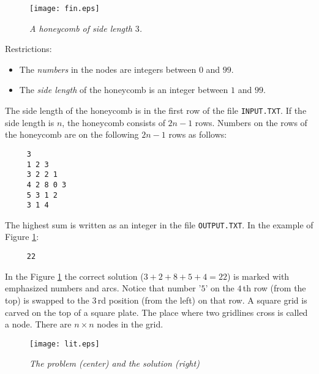 \begin{figure}[h] \begin{center}
\texttt{[image: fin.eps]}
\caption{\small{\textit{A honeycomb of side length $3$.}}} \label{honeycomb-fig}
\end{center} \end{figure}

Restrictions:
\begin{itemize}
 \item The {\em numbers} in the nodes are integers between $0$ and $99$.
 \item The {\em side length} of the honeycomb is an integer between $1$ and $99$.
\end{itemize}

 The side length of the honeycomb is in the first row of the file {\tt INPUT.TXT}.
 If the side length is $n$, the honeycomb consists of $2n-1$ rows.  Numbers on
 the rows of the honeycomb are on the following $2n-1$ rows as follows:

\begin{verbatim}
     3
     1 2 3
     3 2 2 1
     4 2 8 0 3
     5 3 1 2
     3 1 4
\end{verbatim}

 The highest sum is written as an integer in the file {\tt OUTPUT.TXT}.
 In the example of Figure \ref{honeycomb-fig}:

\begin{verbatim}
     22
\end{verbatim}

In the Figure \ref{honeycomb-fig} the correct solution
($3+2+8+5+4=22$) is marked with emphasized numbers and arcs.  Notice
that number '$5$' on the $4\,$th row (from the top) is swapped to the $3\,$rd
position (from the left) on that row.
\newpage
A square grid is carved on the top of a square plate. The place where two gridlines
cross is called a node. There are $n\times n$ nodes in the grid.

\begin{figure}[h] \begin{center}
\texttt{[image: lit.eps]}
\caption{\small{\textit{The problem (center) and the solution (right)}}} \label{lit-fig}
\end{center} \end{figure}

